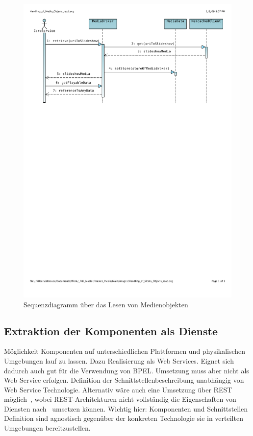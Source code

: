   \begin{figure}[ht]
    \centering
      \includegraphics[width=.9\textwidth]{images/Handling_of_Media_Objects_read.pdf}
    \caption{Sequenzdiagramm über das Lesen von Medienobjekten}
    \label{fig:images_Handling_of_Media_Objects_read}
  \end{figure}
  

\subsection{Extraktion der Komponenten als Dienste} %
\label{sub:extraktion_der_komponenten_als_dienste}

  Möglichkeit Komponenten auf unterschiedlichen Plattformen und physikalischen Umgebungen lauf zu lassen. Dazu Realisierung als Web Services. Eignet sich dadurch auch gut für die Verwendung von BPEL. Umsetzung muss aber nicht als Web Service erfolgen. Definition der Schnittstellenbeschreibung unabhängig von Web Service Technologie. Alternativ wäre auch eine Umsetzung über REST möglich~\citep{fielding00rest}, wobei REST-Architekturen nicht vollständig die  Eigenschaften von Diensten nach~\citep{service_oriented_computing} umsetzen können. Wichtig hier: Komponenten und Schnittstellen Definition sind agnostisch gegenüber der konkreten Technologie sie in verteilten Umgebungen bereitzustellen. 
  
